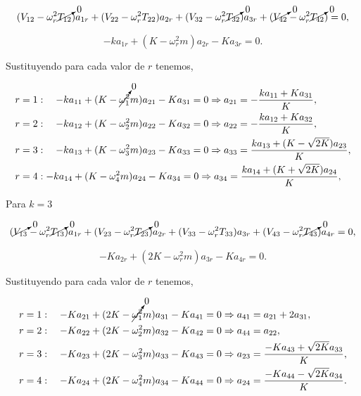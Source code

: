 \documentclass[a4paper,10pt]{article}
\numberwithin{equation}{section}
\begin{document}
\begin{equation}
 (V_{12} - \omega_r^2 \cancelto{0}{T_{12}})a_{1r} + (V_{22} - \omega_r^2 T_{22})a_{2r} 
  + (V_{32} - \omega_r^2 \cancelto{0}{T_{32}})a_{3r} + (\cancelto{0}{V_{42}} - \omega_r^2 \cancelto{0}{T_{42}})= 0,
\end{equation}

\begin{equation}
 -ka_{1r} + (K - \omega_r^2m)a_{2r} - Ka_{3r} = 0.
\end{equation}

Sustituyendo para cada valor de $r$ tenemos,

\begin{align}
 r &= 1: \quad -ka_{11} + (K - \cancelto{0}{\omega_1^2}m)a_{21} - Ka_{31} = 0 \Rightarrow 
 a_{21} = - \frac{ka_{11} + Ka_{31}}{K}, \\
 r &= 2: \quad -ka_{12} + (K - \omega_2^2m)a_{22} - Ka_{32} = 0 \Rightarrow
 a_{22} = - \frac{ka_{12} + Ka_{32}}{K}, \\
 r &= 3: \quad -ka_{13} + (K - \omega_3^2m)a_{23} - Ka_{33} = 0 \Rightarrow
 a_{33} = \frac{ka_{13} + (K - \sqrt{2K})a_{23}}{K}, \\
 r &= 4: -ka_{14} + (K - \omega_4^2m)a_{24} - Ka_{34} = 0 \Rightarrow 
 a_{34} = \frac{ka_{14} + (K + \sqrt{2K})a_{24}}{K},
\end{align}

Para $k = 3$ 

\begin{equation}
 (\cancelto{0}{V_{13}} - \omega_r^2 \cancelto{0}{T_{13}})a_{1r} + (V_{23} - \omega_r^2 \cancelto{0}{T_{23}})a_{2r} 
  + (V_{33} - \omega_r^2 T_{33})a_{3r} + (V_{43} - \omega_r^2 \cancelto{0}{T_{43}})a_{4r} = 0,
\end{equation}

\begin{equation}
 - Ka_{2r} + (2K - \omega_r^2m)a_{3r} - Ka_{4r} = 0.
\end{equation}

Sustituyendo para cada valor de $r$ tenemos,

\begin{align}
 r &= 1: \quad - Ka_{21} + (2K - \cancelto{0}{\omega_1^2}m)a_{31} - Ka_{41} = 0 \Rightarrow
 a_{41} = a_{21} + 2a_{31}, \\
 r &= 2: \quad - Ka_{22} + (2K - \omega_2^2m)a_{32} - Ka_{42} = 0 \Rightarrow
 a_{44} = a_{22}, \\
 r &= 3: \quad - Ka_{23} + (2K - \omega_3^2m)a_{33} - Ka_{43} = 0 \Rightarrow
 a_{23} = \frac{- Ka_{43} + \sqrt{2K}a_{33}}{K}, \\
 r &= 4: \quad - Ka_{24} + (2K - \omega_4^2m)a_{34} - Ka_{44} = 0 \Rightarrow
 a_{24} = \frac{- Ka_{44} - \sqrt{2K}a_{34}}{K}.
\end{align}
\end{document}
